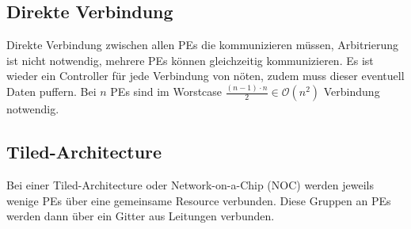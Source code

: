\subsection{Direkte Verbindung}
Direkte Verbindung zwischen allen PEs die kommunizieren müssen, Arbitrierung ist nicht notwendig, mehrere PEs können gleichzeitig kommunizieren. 
Es ist wieder ein Controller für jede Verbindung von nöten, zudem muss dieser eventuell Daten puffern. 
Bei $n$ PEs sind im Worstcase $\frac{(n-1)\cdot n}{2} \in  \mathcal{O}(n^2)$ Verbindung notwendig.

\subsection{Tiled-Architecture}
Bei einer Tiled-Architecture oder Network-on-a-Chip (NOC) werden jeweils wenige PEs über eine gemeinsame Resource verbunden. 
Diese Gruppen an PEs werden dann über ein Gitter aus Leitungen verbunden.
